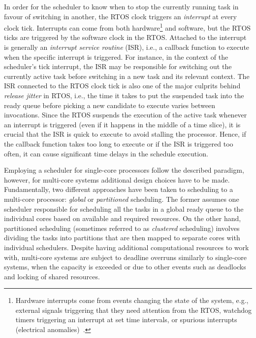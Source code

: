 In order for the scheduler to know when to stop the currently running task in favour of switching in another, the RTOS clock triggers an \emph{interrupt} at every clock tick.
Interrupts can come from both hardware\footnote{Hardware interrupts come from events changing the state of the system, e.g., external signals triggering that they need attention from the RTOS, watchdog timers triggering an interrupt at set time intervals, or spurious interrupts (electrical anomalies)~\cite{Drepper:2003}.} and software, but the RTOS ticks are triggered by the software clock in the RTOS.
Attached to the interrupt is generally an \emph{interrupt service routine} (ISR), i.e., a callback function to execute when the specific interrupt is triggered.
For instance, in the context of the scheduler's tick interrupt, the ISR may be responsible for switching out the currently active task before switching in a new task and its relevant context.
The ISR connected to the RTOS clock tick is also one of the major culprits behind \emph{release jitter} in RTOS, i.e., the time it takes to put the suspended task into the ready queue before picking a new candidate to execute varies between invocations.
Since the RTOS suspends the execution of the active task whenever an interrupt is triggered (even if it happens in the middle of a time slice), it is crucial that the ISR is quick to execute to avoid stalling the processor.
Hence, if the callback function takes too long to execute or if the ISR is triggered too often, it can cause significant time delays in the schedule execution.

Employing a scheduler for single-core processors follow the described paradigm, however, for multi-core systems additional design choices have to be made.
Fundamentally, two different approaches have been taken to scheduling to a multi-core processor: \emph{global} or \emph{partitioned} scheduling.
The former assumes one scheduler responsible for scheduling all the tasks in a global ready queue to the individual cores based on available and required resources.
On the other hand, partitioned scheduling (sometimes referred to as \emph{clustered} scheduling) involves dividing the tasks into partitions that are then mapped to separate cores with individual schedulers.
Despite having additional computational resources to work with, multi-core systems are subject to deadline overruns similarly to single-core systems, when the capacity is exceeded or due to other events such as deadlocks and locking of shared resources.


